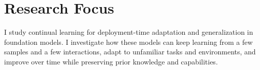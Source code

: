 \section{Research Focus}
{\raggedright
I study continual learning for deployment-time adaptation and generalization
in foundation models. I investigate how these models can keep learning from
a few samples and a few interactions, adapt to unfamiliar tasks and environments, and
improve over time while preserving prior knowledge and capabilities.\par}
